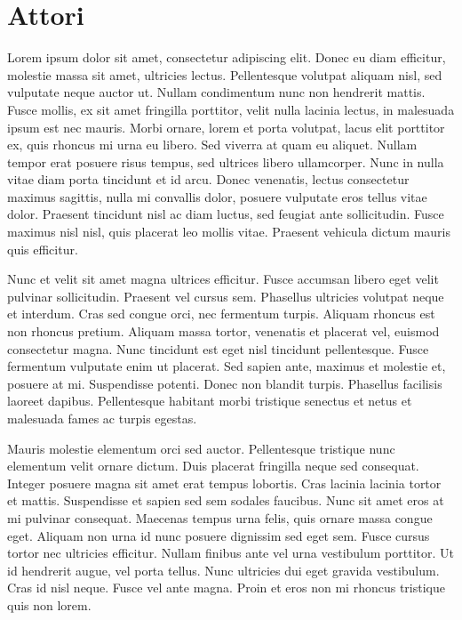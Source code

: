 \section{Attori}

Lorem ipsum dolor sit amet, consectetur adipiscing elit. Donec eu diam efficitur, molestie massa sit amet, ultricies lectus. Pellentesque volutpat aliquam nisl, sed vulputate neque auctor ut. Nullam condimentum nunc non hendrerit mattis. Fusce mollis, ex sit amet fringilla porttitor, velit nulla lacinia lectus, in malesuada ipsum est nec mauris. Morbi ornare, lorem et porta volutpat, lacus elit porttitor ex, quis rhoncus mi urna eu libero. Sed viverra at quam eu aliquet. Nullam tempor erat posuere risus tempus, sed ultrices libero ullamcorper. Nunc in nulla vitae diam porta tincidunt et id arcu. Donec venenatis, lectus consectetur maximus sagittis, nulla mi convallis dolor, posuere vulputate eros tellus vitae dolor. Praesent tincidunt nisl ac diam luctus, sed feugiat ante sollicitudin. Fusce maximus nisl nisl, quis placerat leo mollis vitae. Praesent vehicula dictum mauris quis efficitur.

Nunc et velit sit amet magna ultrices efficitur. Fusce accumsan libero eget velit pulvinar sollicitudin. Praesent vel cursus sem. Phasellus ultricies volutpat neque et interdum. Cras sed congue orci, nec fermentum turpis. Aliquam rhoncus est non rhoncus pretium. Aliquam massa tortor, venenatis et placerat vel, euismod consectetur magna. Nunc tincidunt est eget nisl tincidunt pellentesque. Fusce fermentum vulputate enim ut placerat. Sed sapien ante, maximus et molestie et, posuere at mi. Suspendisse potenti. Donec non blandit turpis. Phasellus facilisis laoreet dapibus. Pellentesque habitant morbi tristique senectus et netus et malesuada fames ac turpis egestas.

Mauris molestie elementum orci sed auctor. Pellentesque tristique nunc elementum velit ornare dictum. Duis placerat fringilla neque sed consequat. Integer posuere magna sit amet erat tempus lobortis. Cras lacinia lacinia tortor et mattis. Suspendisse et sapien sed sem sodales faucibus. Nunc sit amet eros at mi pulvinar consequat. Maecenas tempus urna felis, quis ornare massa congue eget. Aliquam non urna id nunc posuere dignissim sed eget sem. Fusce cursus tortor nec ultricies efficitur. Nullam finibus ante vel urna vestibulum porttitor. Ut id hendrerit augue, vel porta tellus. Nunc ultricies dui eget gravida vestibulum. Cras id nisl neque. Fusce vel ante magna. Proin et eros non mi rhoncus tristique quis non lorem.